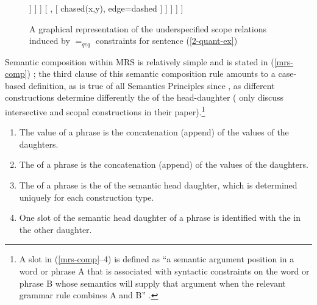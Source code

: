 \documentclass[output=paper]{langsci/langscibook}
\begin{document}
\begin{figure}
\begin{forest}
[ top
[ {chased(x,y)}, edge=dashed
	[ every, no edge
		[ dog(x), edge=dashed ]
		[ {}, no edge 
				[ some(y), no edge 
					[ cat (y), edge=dashed ] 
					[ {}, [ {chased(x,y)}, edge=dashed	 ] ] ] ] 
		[ {}, [ {chased(x,y)}, edge=dashed ] ]			
					] 
	]
	]
\end{forest}
\caption{\label{fig:MRS-tree}A graphical representation of the underspecified scope relations induced by $=_{qeq}$ constraints for sentence (\ref{2-quant-ex})}
\end{figure}

Semantic composition within MRS is relatively simple and is stated in (\ref{mrs-comp}) \citep[313--314]{Copestakeetal2005}; the third clause of this semantic composition rule amounts to a case-based definition, as is true of all Semantics Principles  since \citet{PollardandSag1987}, as different constructions determine differently the  of the head-daughter (\citealt{Copestakeetal2005} only discuss intersective and scopal constructions in their paper).\footnote{A slot in (\ref{mrs-comp}--4) is defined as ``a semantic argument position in a word or phrase A that is associated with syntactic constraints on the word or phrase B whose semantics will supply that argument when the relevant grammar rule combines A and B'' \citep[313]{Copestakeetal2005}.}

\begin{exe}
\ex\label{mrs-comp}
\begin{enumerate}
\item The  value of a phrase is the concatenation (append) of the 
values of the daughters.
\item The  of a phrase is the concatenation (append) of the  values of the daughters.
\item The  of a phrase is the  of the semantic head daughter, which is determined uniquely for each construction type.
\item One slot of the semantic head daughter of a phrase is identified with the  in the other daughter. 
\end{enumerate}
\end{exe}
\end{document}
